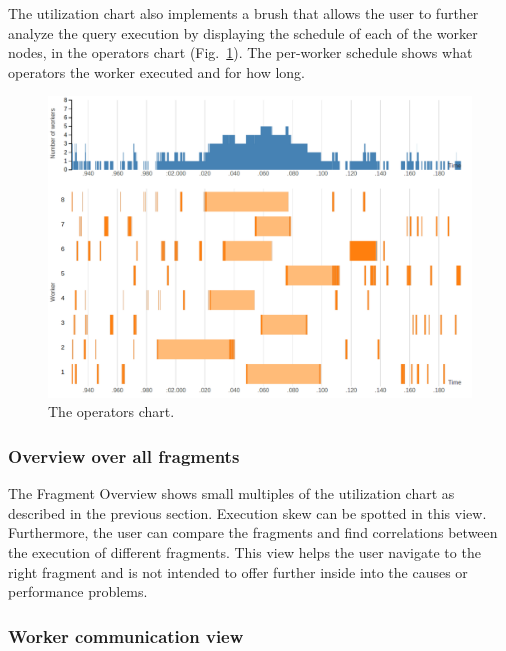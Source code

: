 \documentclass{chi2009}
\newcommand*{\overall}{Fragment Overview\xspace}
\begin{document}
The utilization chart also implements a brush that allows the user to further
analyze the query execution by displaying the schedule of each of the worker
nodes, in the operators chart (Fig.~\ref{fig:operators_chart}). The per-worker
schedule shows what operators the worker executed and for how long.


\begin{figure}[ht]
  \includegraphics[width=\columnwidth]{images/operators_chart}
  \caption{The operators chart.}
  \label{fig:operators_chart}
\end{figure}


\subsubsection{Overview over all fragments}
\label{sec:fragments}


The \overall shows small multiples of the utilization chart as described in the previous section.
Execution skew can be spotted in this view. Furthermore, the user can compare the fragments and find
correlations between the execution of different fragments. This view helps the user navigate to the
right fragment and is not intended to offer further inside into the causes or performance problems.


\subsubsection{Worker communication view}
\end{document}
